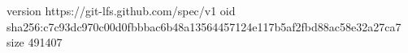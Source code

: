 version https://git-lfs.github.com/spec/v1
oid sha256:c7c93dc970c00d0fbbbac6b48a13564457124e117b5af2fbd88ac58e32a27ca7
size 491407
